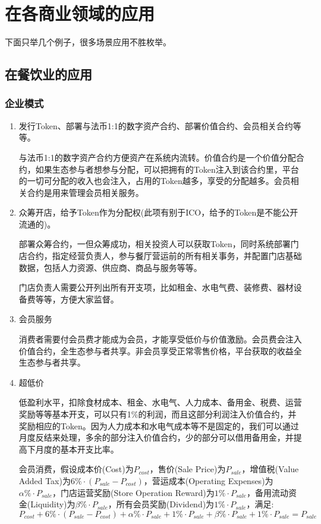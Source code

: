 \documentclass[UTF9]{ctexart}
\begin{document}
\section{在各商业领域的应用}

下面只举几个例子，很多场景应用不胜枚举。

\subsection{在餐饮业的应用}

\subsubsection{企业模式}

\begin{enumerate}

\item 发行Token、部署与法币1:1的数字资产合约、部署价值合约、会员相关合约等等。

与法币1:1的数字资产合约方便资产在系统内流转。价值合约是一个价值分配合约，如果生态参与者想参与分配，可以把拥有的Token注入到该合约里，平台的一切可分配的收入也会注入，占用的Token越多，享受的分配越多。会员相关合约是用来管理会员相关服务。

\item 众筹开店，给予Token作为分配权(此项有别于ICO，给予的Token是不能公开流通的)。

部署众筹合约，一但众筹成功，相关投资人可以获取Token，同时系统部署门店合约，指定经营负责人，参与餐厅营运前的所有相关事务，并配置门店基础数据，包括人力资源、供应商、商品与服务等等。

门店负责人需要公开列出所有开支项，比如租金、水电气费、装修费、器材设备费等等，方便大家监督。

\item 会员服务

消费者需要付会员费才能成为会员，才能享受低价与价值激励。会员费会注入价值合约，全生态参与者共享。非会员享受正常零售价格，平台获取的收益全生态参与者共享。

\item 超低价

低盈利水平，扣除食材成本、租金、水电气、人力成本、备用金、税费、运营奖励等等基本开支，可以只有1\%的利润，而且这部分利润注入价值合约，并奖励相应的Token。因为人力成本和水电气成本等不是固定的，我们可以通过月度反结来处理，多余的部分注入价值合约，少的部分可以借用备用金，并提高下月度的基本开支比率。

会员消费，假设成本价(Cost)为$P_{cost}$，售价(Sale Price)为$P_{sale}$，增值税(Value Added Tax)为$6\% \cdot (P_{sale}-P_{cost})$，营运成本(Operating Expenses)为${\alpha}\% \cdot P_{sale}$，门店运营奖励(Store Operation Reward)为$1\% \cdot P_{sale}$，备用流动资金(Liquidity)为${\beta}\% \cdot P_{sale}$，所有会员奖励(Dividend)为$1\% \cdot P_{sale}$，满足:
\[
	P_{cost} + 6\% \cdot (P_{sale}-P_{cost}) + {\alpha}\% \cdot P_{sale} + 1\% \cdot P_{sale} + {\beta}\% \cdot P_{sale} + 1\% \cdot P_{sale} = P_{sale}
\]


\end{enumerate}
\end{document}
